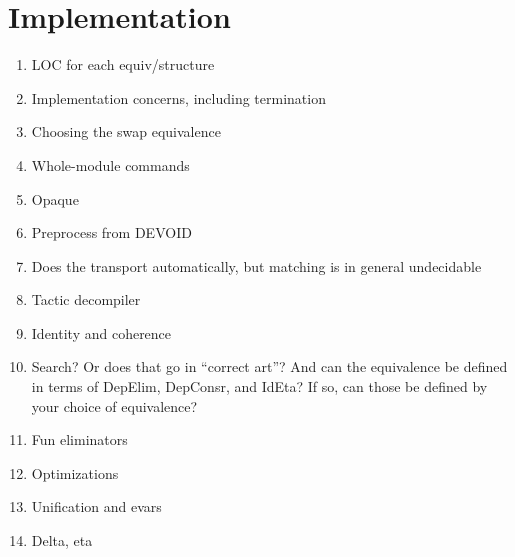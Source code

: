\section{Implementation}

\begin{enumerate}
\item LOC for each equiv/structure
\item Implementation concerns, including termination
\item Choosing the swap equivalence
\item Whole-module commands
\item Opaque
\item Preprocess from DEVOID
\item Does the transport automatically, but matching is in general undecidable
\item Tactic decompiler
\item Identity and coherence
\item Search? Or does that go in ``correct art''? And can the equivalence be defined in terms of DepElim, DepConsr, and IdEta? If so, can those be defined by your
      choice of equivalence?
\item Fun eliminators
\item Optimizations
\item Unification and evars
\item Delta, eta
\end{enumerate}
